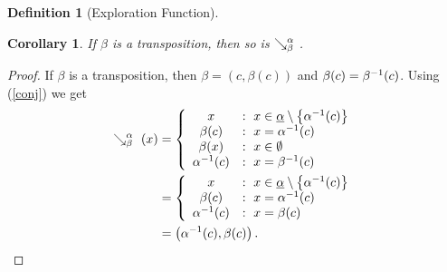 \documentclass[a4paper,twoside,12pt,openany]{report}
\theoremstyle{plain}
\newtheorem{lemma}{Lemma}
\newtheorem{corollary}{Corollary}
\theoremstyle{definition}
\newtheorem{definition}{Definition}
\theoremstyle{remark}
\begin{document}
\begin{definition}[Exploration Function]
\begin{corollary}\label{cor1}
	If \(\beta\) is a transposition, then so is  \(\searrow^{\alpha}_{\beta}\ \).
\end{corollary}
\begin{proof}
	If \(\beta\) is a transposition, then \(\beta=\left(c,\beta(c)\right)\) and \(\beta(c)=\beta^{-1}(c)\). Using (\ref{conj}) we get 
\begin{align}
	\conjl \alpha \beta (x) &= \left\{
				\begin{array}{cl}
					x & : \ x\in\alphaset\setminus\left\{\alpha\inv(c)\right\} \\
					\beta(c) & : \ x=\alpha\inv(c) \\
					\beta(x) & : \ x\in\emptyset \\
					\alpha\inv(c) & : \ x=\beta\inv(c) \\
				\end{array}
			\right. \\
	&= \left\{
				\begin{array}{cl}
					x & : \ x\in\alphaset\setminus\left\{\alpha\inv(c)\right\} \\
					\beta(c) & : \ x=\alpha\inv(c) \\
					\alpha\inv(c) & : \ x=\beta(c) \\
				\end{array}
			\right. \\
	&= \left(\alpha\inv(c),\beta(c)\right).
\end{align}
\end{proof}

\end{definition}
\end{document}
